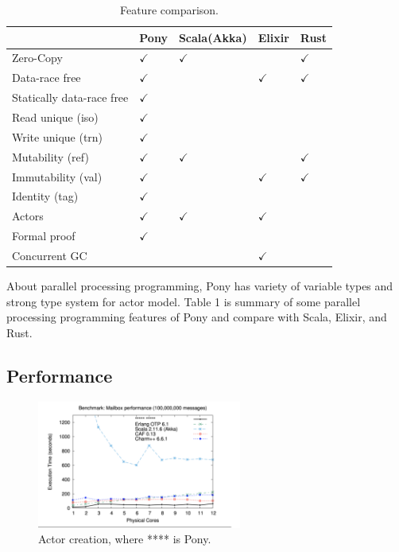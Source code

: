 \documentclass{article}
\begin{document}
\begin{multicols}{2}
\begin{table}[]
\centering
\begin{tabular}{lllll}
\hline
                          & Pony & Scala(Akka) & Elixir & Rust \\ \hline \hline
Zero-Copy                 & $\checkmark$ & $\checkmark$& &  $\checkmark$    \\ \hline
Data-race free            & $\checkmark$ &       & $\checkmark$& $\checkmark$ \\ \hline
Statically data-race free & $\checkmark$ &       &        &      \\ \hline
Read unique (iso)         & $\checkmark$&       &        &      \\ \hline
Write unique (trn)        & $\checkmark$&       &        &      \\ \hline
Mutability (ref)          &$\checkmark$ &$\checkmark$ &        &$\checkmark$ \\ \hline
Immutability (val)        &$\checkmark$&       & $\checkmark$& $\checkmark$\\ \hline
Identity (tag)            &$\checkmark$&       &        &      \\ \hline
Actors                    &$\checkmark$& $\checkmark$ & $\checkmark$&      \\ \hline
Formal proof              &$\checkmark$&       &        &      \\ \hline
Concurrent GC          & &       &   $\checkmark$     &      \\ \hline
\end{tabular}
\caption{Feature comparison.\cite{type-proof-paper}}
\end{table}


About parallel processing programming, Pony has variety of variable types and strong type system for actor model.
Table 1 is summary of some parallel processing programming features of Pony and compare with Scala, Elixir, and Rust.

\subsection{Performance}


\begin{figure}
\centering 		\includegraphics[width=0.6\textwidth]{a}
\caption{Actor creation, where **** is Pony. \cite{type-proof-paper}}
\end{figure}




\end{multicols}
\end{document}
